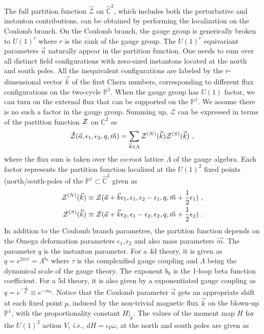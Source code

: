 \documentclass[letterpaper, 11pt]{article}
\def\IC{\mathbb{C}}
\def\IP{\mathbb{P}}
\def\CZ{{\cal Z}}
\def\e{\epsilon}
\def\half{\frac{1}{2}}
\begin{document}
The full partition function $\hat{\mathcal Z}$ on $\hat{\IC}^2$, which includes both the perturbative and instanton contributions, can be obtained by performing the localization on the Coulomb branch. On the Coulomb branch, the gauge group is generically broken to $U(1)^r$ where $r$ is the rank of the gauge group. The $U(1)^r$ equivariant parameters $\vec{a}$ naturally appear in the partition function. One needs to sum over all distinct field configurations with zero-sized instantons located at the north and south poles. All the inequivalent configurations are labeled by the $r$-dimensional vector $\vec{k}$ of the first Chern numbers, corresponding to different flux configurations on the two-cycle $\mathbb{P}^1$. When the gauge group has $U(1)$ factor, we can turn on the external flux that can be supported on the $\IP^1$. We assume there is no such a factor in the gauge group. 
Summing up, $\hat{\mathcal Z}$ can be expressed in terms of the partition function $\CZ$ on $\IC^2$ as \cite{Nekrasov:2003vi, Gottsche:2006bm, Gottsche:2006tn, Gasparim:2008ri, Bonelli:2012ny}
\begin{align} \label{eq:blowup}
  \hat{\mathcal Z}(\vec{a}, \e_1, \e_2, q, \vec{m}) = \sum_{\vec{k} \in \Lambda} \CZ^{(N)}(\vec{k}) \CZ^{(S)}(\vec{k}) \ , 
\end{align}
where the flux sum is taken over the co-root lattice $\Lambda$ of the gauge algebra. Each factor represents the partition function localized at the $U(1)^2$ fixed points (north/south-poles of the $\IP^1 \subset \hat{\IC}^2$ given as 
\begin{align}
\begin{split}
 \CZ^{(N)}(\vec{k}) &\equiv \CZ (\vec{a}+ \vec{k} \e_1, \e_1, \e_2 - \e_1, q, \vec{m}+\half{\e_1}) \ , \\
 \CZ^{(S)}(\vec{k}) & \equiv  \CZ (\vec{a}+\vec{k} \e_2, \e_1 - \e_2, \e_2, q, \vec{m}+\half{\e_2})  \ . 
\end{split}
\end{align}
 In addition to the Coulomb branch parametres, the partition function depends on the Omega deformation parameters $\e_1, \e_2$ and also mass parameters $\vec{m}$. The parameter $q$ is the instanton parameter. For a 4d theory, it is given as $q = e^{2\pi i \tau} = \Lambda^{b_0} $ where $\tau$ is the complexified gauge coupling and $\Lambda$ being the dynamical scale of the gauge theory. The exponent $b_0$ is the 1-loop beta function coefficient. For a 5d theory, it is also given by a exponentiated gauge coupling as $q=e^{-\frac{1}{g^2}} \equiv e^{-m_0}$. 
Notice that the Coulomb parameter $\vec{a}$ gets an appropriate shift at each fixed point $p$, induced by the non-trivial magnetic flux $\vec{k}$ on the blown-up $\IP^1$, with the proportionality constant $H|_p$. The values of the moment map $H$ for the $U(1)^2$ action $V$,  \textit{i.e.}, $dH = \iota_V \omega$, at the north and south poles are given as
\end{document}
